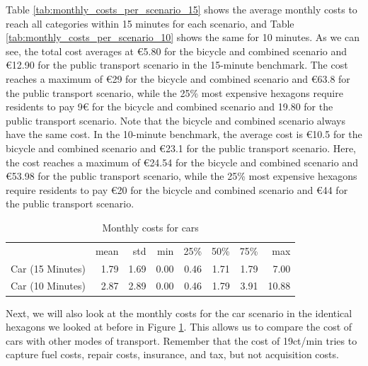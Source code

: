 Table \ref{tab:monthly_costs_per_scenario_15} shows the average monthly costs to reach all categories within 15 minutes for each scenario, and Table \ref{tab:monthly_costs_per_scenario_10} shows the same for 10 minutes.
As we can see, the total cost averages at \euro{5.80} for the bicycle and combined scenario and \euro{12.90} for the public transport scenario in the 15-minute benchmark.
The cost reaches a maximum of \euro{29} for the bicycle and combined scenario and \euro{63.8} for the public transport scenario, while the 25\% most expensive hexagons require residents to pay 9\euro{} for the bicycle and combined scenario and 19.80 for the public transport scenario.
Note that the bicycle and combined scenario always have the same cost.
In the 10-minute benchmark, the average cost is \euro{10.5} for the bicycle and combined scenario and \euro{23.1} for the public transport scenario.
Here, the cost reaches a maximum of \euro{24.54} for the bicycle and combined scenario and \euro{53.98} for the public transport scenario, while the 25\% most expensive hexagons require residents to pay \euro{20} for the bicycle and combined scenario and \euro{44} for the public transport scenario.

\begin{table}
  \caption{Monthly costs for cars}
  \label{tab:monthly_costs_for_cars}
  \begin{center}
    \begin{tabular}{lrrrrrrr}
     & mean & std & min & 25\% & 50\% & 75\% & max \\
    Car (15 Minutes) & 1.79 & 1.69 & 0.00 & 0.46 & 1.71 & 1.79 & 7.00 \\
    Car (10 Minutes) & 2.87 & 2.89 & 0.00 & 0.46 & 1.79 & 3.91 & 10.88 \\
    \end{tabular}
  \end{center}
\end{table}

Next, we will also look at the monthly costs for the car scenario in the identical hexagons we looked at before in Figure \ref{tab:monthly_costs_for_cars}.
This allows us to compare the cost of cars with other modes of transport.
Remember that the cost of 19ct/min tries to capture fuel costs, repair costs, insurance, and tax, but not acquisition costs.
